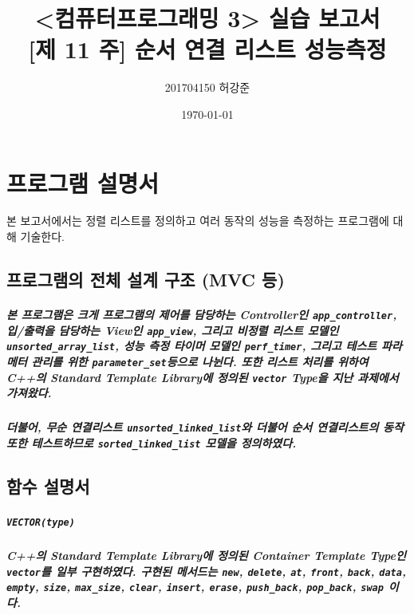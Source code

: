 \documentclass[UTF8, a4paper]{report}
\title{%
    <컴퓨터프로그래밍 3> 실습 보고서 \\ 
    \large [제 11 주] 순서 연결 리스트 성능측정}
\author{201704150 허강준}
\date{\today}
\begin{document}
    \maketitle
    \tableofcontents

    \chapter{프로그램 설명서}
        본 보고서에서는 정렬 리스트를 정의하고 여러 동작의 성능을 측정하는 프로그램에 대해 기술한다.

        \section{프로그램의 전체 설계 구조 (MVC 등)}
            
            \paragraph{%
                \normalfont 본 프로그램은 크게 프로그램의 제어를 담당하는 Controller인 \texttt{app\_controller}, 입/출력을 담당하는 View인 \texttt{app\_view}, 그리고 비정렬 리스트 모델인 \texttt{unsorted\_array\_list}, 성능 측정 타이머 모델인 \texttt{perf\_timer}, 그리고 테스트 파라메터 관리를 위한 \texttt{parameter\_set}등으로 나뉜다. 또한 리스트 처리를 위하여 C++의 Standard Template Library에 정의된 \texttt{vector} Type을 지난 과제에서 가져왔다.
            }

            \paragraph{%
                \normalfont 더불어, 무순 연결리스트 \texttt{unsorted\_linked\_list}와 더불어 순서 연결리스트의 동작 또한 테스트하므로 \texttt{sorted\_linked\_list} 모델을 정의하였다.  
            }
            
        \section{함수 설명서}
            
            \paragraph{\texttt{VECTOR(type)}}
            \paragraph{%
                \normalfont C++의 Standard Template Library에 정의된 Container Template Type인 \texttt{vector}를 일부 구현하였다. 구현된 메서드는 \texttt{new},  \texttt{delete}, \texttt{at}, \texttt{front}, \texttt{back}, \texttt{data}, \texttt{empty}, \texttt{size}, \texttt{max\_size}, \texttt{clear}, \texttt{insert}, \texttt{erase}, \texttt{push\_back}, \texttt{pop\_back}, \texttt{swap} 이다.
            }
\end{document}
